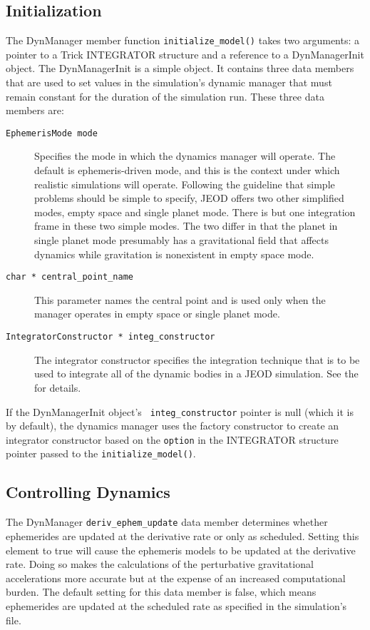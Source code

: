 \subsection{Initialization}\label{sec:user_analysis_initialization}
The DynManager member function \verb+initialize_model()+ takes two arguments:
a pointer to a Trick INTEGRATOR structure
and a reference to a DynManagerInit object.
The DynManagerInit is a simple object. It contains three data members that
are used to set values in the simulation's dynamic manager that must
remain constant for the duration of the simulation run. These three data
members are:\begin{description}
\item[{\tt EphemerisMode mode}]
  Specifies the mode in which the dynamics manager will operate.
  The default is ephemeris-driven mode, and this is the context under which
  realistic simulations will operate. Following the guideline that simple
  problems should be simple to specify, JEOD offers two other simplified modes,
  empty space and single planet mode. There is but one integration frame
  in these two simple modes. The two differ in that the planet in single
  planet mode presumably has a gravitational field that affects dynamics
  while gravitation is nonexistent in empty space mode.
\item[{\tt char * central\_point\_name}]
  This parameter names the central point and is used only when the manager
  operates in empty space or single planet mode. 
\item[{\tt IntegratorConstructor * integ\_constructor}]
  The integrator constructor specifies the integration technique that is
  to be used to integrate all of the dynamic bodies in a JEOD simulation.
  See the  for details.
\end{description}

If the DynManagerInit object's \verb+ integ_constructor+ pointer is null
(which it is by default), the dynamics manager uses the \INTEGRATION factory constructor to create an integrator constructor based on the \verb+option+
in the INTEGRATOR structure pointer passed to the \verb+initialize_model()+.

\subsection{Controlling Dynamics}\label{sec:user_analysis_dynamics}
The DynManager \verb+deriv_ephem_update+ data member determines whether
ephemerides are updated at the derivative rate or only as scheduled.
Setting this element to true will cause the ephemeris models to be updated at
the derivative rate. Doing so makes the calculations of the perturbative
gravitational accelerations more accurate but at the expense of an increased
computational burden. The default setting for this data member is false,
which means ephemerides are updated at the scheduled rate as specified
in the simulation's \Sdefine file.


